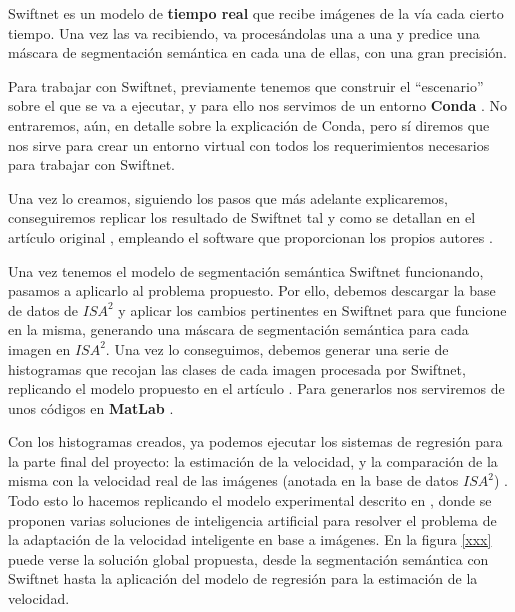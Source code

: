 Swiftnet es un modelo de \textbf{tiempo real} que recibe imágenes de la vía cada cierto tiempo. Una vez las va recibiendo, va procesándolas una a una y predice una máscara de segmentación semántica en cada una de ellas, con una gran precisión.

Para trabajar con Swiftnet, previamente tenemos que construir el ``escenario'' sobre el que se va a ejecutar, y para ello nos servimos de un entorno \textbf{Conda} \cite{conda}. No entraremos, aún, en detalle sobre la explicación de Conda, pero sí diremos que nos sirve para crear un entorno virtual con todos los requerimientos necesarios para trabajar con Swiftnet.

Una vez lo creamos, siguiendo los pasos que más adelante explicaremos, conseguiremos replicar los resultado de Swiftnet tal y como se detallan en el artículo original \cite{swiftnet}, empleando el software que proporcionan los propios autores \cite{github_swiftnet}.


Una vez tenemos el modelo de segmentación semántica Swiftnet funcionando, pasamos a aplicarlo al problema propuesto. Por ello, debemos descargar la base de datos de $ISA^{2}$ y aplicar los cambios pertinentes en Swiftnet para que funcione en la misma, generando una máscara de segmentación semántica para cada imagen en $ISA^{2}$. Una vez lo conseguimos, debemos generar una serie de histogramas \cite{histograma} que recojan las clases de cada imagen procesada por Swiftnet, replicando el modelo propuesto en el artículo \cite{añade nuestro paper}. Para generarlos nos serviremos de unos códigos en \textbf{MatLab} \cite{matlab}.

Con los histogramas creados, ya podemos ejecutar los sistemas de regresión para la parte final del proyecto: la estimación de la velocidad, y la comparación de la misma con la velocidad real de las imágenes (anotada en la base de datos $ISA^{2}$) . Todo esto lo hacemos replicando el modelo experimental descrito en \cite{añade nuestro paper}, donde se proponen varias soluciones de inteligencia artificial para resolver el problema de la adaptación de la velocidad inteligente en base a imágenes. En la figura \ref{xxx} puede verse la solución global propuesta, desde la segmentación semántica con Swiftnet hasta la aplicación del modelo de regresión para la estimación de la velocidad. 

